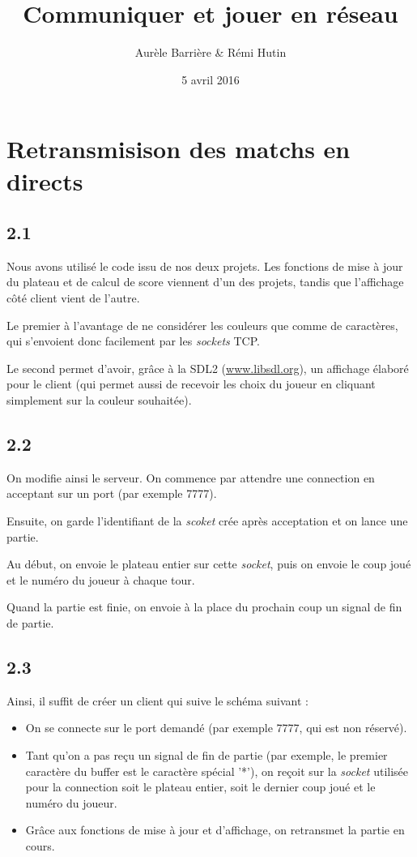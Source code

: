 \documentclass[12pt]{article}
\title{Communiquer et jouer en réseau}
\author{Aurèle Barrière \& Rémi Hutin}
\date{5 avril 2016}
\def\question#1{\subsection{#1}}
\def\sec#1{\section{#1}}
\begin{document}
\maketitle
\tableofcontents

\sec{Retransmisison des matchs en directs}
\question{2.1}
Nous avons utilisé le code issu de nos deux projets. Les fonctions de mise à jour du plateau et de calcul de score viennent d'un des projets, tandis que l'affichage côté client vient de l'autre.

Le premier à l'avantage de ne considérer les couleurs que comme de caractères, qui s'envoient donc facilement par les \textit{sockets} TCP.

Le second permet d'avoir, grâce à la SDL2 (\url{www.libsdl.org}), un affichage élaboré pour le client (qui permet aussi de recevoir les choix du joueur en cliquant simplement sur la couleur souhaitée).




\question{2.2}
On modifie ainsi le serveur. On commence par attendre une connection en acceptant sur un port (par exemple 7777).

Ensuite, on garde l'identifiant de la \textit{scoket} crée après acceptation et on lance une partie.

Au début, on envoie le plateau entier sur cette \textit{socket}, puis on envoie le coup joué et le numéro du joueur à chaque tour.

Quand la partie est finie, on envoie à la place du prochain coup un signal de fin de partie.


\question{2.3}
Ainsi, il suffit de créer un client qui suive le schéma suivant :
\begin{itemize}
\item On se connecte sur le port demandé (par exemple 7777, qui est non réservé).
\item Tant qu'on a pas reçu un signal de fin de partie (par exemple, le premier caractère du buffer est le caractère spécial '*'), on reçoit sur la \textit{socket} utilisée pour la connection soit le plateau entier, soit le dernier coup joué et le numéro du joueur.
\item Grâce aux fonctions de mise à jour et d'affichage, on retransmet la partie en cours.
\end{itemize}

  
\end{document}
